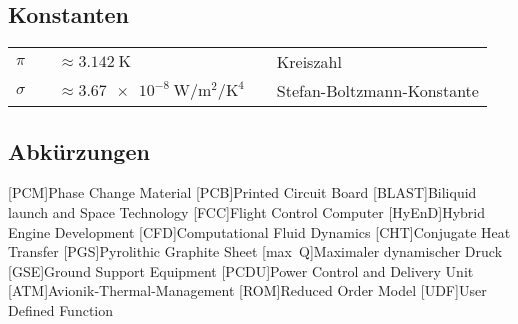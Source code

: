 \subsection*{Konstanten}

\begin{supertabular}{p{10mm}p{3mm}p{50mm}p{3mm}l}
$\pi$ && $\approx \SI{3.142}{\kelvin}$ && Kreiszahl\\
$\sigma$ && $\approx \SI{3.67e-8}{\watt\per\meter\squared\per\kelvin\tothe{4}}$ && Stefan-Boltzmann-Konstante\\
\end{supertabular}

\newpage

\subsection*{Abkürzungen}
\begin{acronym}[BLAST]
[PCM]{Phase Change Material}
[PCB]{Printed Circuit Board}
[BLAST]{Biliquid launch and Space Technology}
[FCC]{Flight Control Computer}
[HyEnD]{Hybrid Engine Development}
[CFD]{Computational Fluid Dynamics}
[CHT]{Conjugate Heat Transfer}
[PGS]{Pyrolithic Graphite Sheet}
[max~Q]{Maximaler dynamischer Druck}
[GSE]{Ground Support Equipment}
[PCDU]{Power Control and Delivery Unit}
[ATM]{Avionik-Thermal-Management}
[ROM]{Reduced Order Model}
[UDF]{User Defined Function}
\end{acronym}